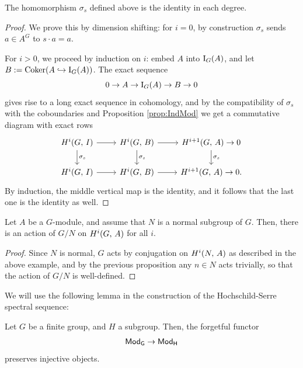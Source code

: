 \documentclass[a4paper, oneside]{memoir}
\begin{document}
\begin{proposition}\label{prop:ConjId}
    The homomorphism $\sigma_s$ defined above is the identity in each degree.
\end{proposition}
\begin{proof}
    We prove this by dimension shifting: for $i=0$, by construction $\sigma_s$ sends $a\in A^G$ to $s\cdot a=a$.

    For $i>0$, we proceed by induction on $i$: embed $A$ into $\mathrm{I}_{G}(A)$, and let $B:=\operatorname{Coker}(A\hookrightarrow \mathrm{I}_{G}(A))$. The exact sequence
    \[
        0\to A\to \mathrm{I}_{G}(A)\to B\to 0
    \]
    gives rise to a long exact sequence in cohomology, and by the compatibility of $\sigma_s$ with the coboundaries and Proposition \ref{prop:IndMod} we get a commutative diagram with exact rows
    \[
        \begin{tikzcd}
            \H{i}{G}{I} \arrow[r] \arrow[d, "\sigma_s"] & \H{i}{G}{B} \arrow[r] \arrow[d, "\sigma_s"] & \H{i+1}{G}{A} \arrow[d, "\sigma_s"] \to 0 \\
            \H{i}{G}{I} \arrow[r]                        & \H{i}{G}{B} \arrow[r]                        & \H{i+1}{G}{A} \to 0.
        \end{tikzcd}
    \]
    By induction, the middle vertical map is the identity, and it follows that the last one is the identity as well.
\end{proof}

\begin{corollary}\label{cor:NormalAction}
    Let $A$ be a $G$-module, and assume that $N$ is a normal subgroup of $G$. Then, there is an action of $G / N$ on $H^{i}( G, \, A )$ for all $i$.
\end{corollary}

\begin{proof}
    Since $N$ is normal, $G$ acts by conjugation on $H^{i}( N, \, A )$ as described in the above example, and by the previous proposition any $n\in N$ acts trivially, so that the action of $G/N$ is well-defined.
\end{proof}

We will use the following lemma in the construction of the Hochschild-Serre spectral sequence:

\begin{lemma}\label{lm:GHInj}
    Let $G$ be a finite group, and $H$ a subgroup. Then, the forgetful functor
    \[
        \mathsf{Mod}_\mathsf{G}\to\mathsf{Mod}_\mathsf{H}
    \]
    preserves injective objects.
\end{lemma}
\end{document}
